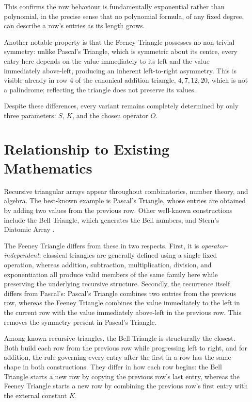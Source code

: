 \documentclass[11pt]{article}
\theoremstyle{definition}
\begin{document}
This confirms the row behaviour is fundamentally exponential rather than polynomial, in the precise sense that no polynomial formula, of any fixed degree, can describe a row's entries as its length grows.

Another notable property is that the Feeney Triangle possesses no non-trivial symmetry: unlike Pascal's Triangle, which is symmetric about its centre, every entry here depends on the value immediately to its left and the value immediately above-left, producing an inherent left-to-right asymmetry. This is visible already in row 4 of the canonical addition triangle, $4,7,12,20$, which is not a palindrome; reflecting the triangle does not preserve its values.

Despite these differences, every variant remains completely determined by only three parameters: $S$, $K$, and the chosen operator $O$.

\section{Relationship to Existing Mathematics}

Recursive triangular arrays appear throughout combinatorics, number theory, and algebra. The best-known example is Pascal's Triangle, whose entries are obtained by adding two values from the previous row. Other well-known constructions include the Bell Triangle, which generates the Bell numbers, and Stern's Diatomic Array \cite{stanley}.

The Feeney Triangle differs from these in two respects. First, it is \emph{operator-independent}: classical triangles are generally defined using a single fixed operation, whereas addition, subtraction, multiplication, division, and exponentiation all produce valid members of the same family here while preserving the underlying recursive structure. Secondly, the recurrence itself differs from Pascal's: Pascal's Triangle combines two entries from the previous row, whereas the Feeney Triangle combines the value immediately to the left in the current row with the value immediately above-left in the previous row. This removes the symmetry present in Pascal's Triangle.

Among known recursive triangles, the Bell Triangle is structurally the closest. Both build each row from the previous row while progressing left to right, and for addition, the rule governing every entry after the first in a row has the same shape in both constructions. They differ in how each row begins: the Bell Triangle starts a new row by copying the previous row's last entry, whereas the Feeney Triangle starts a new row by combining the previous row's first entry with the external constant $K$.
\end{document}
